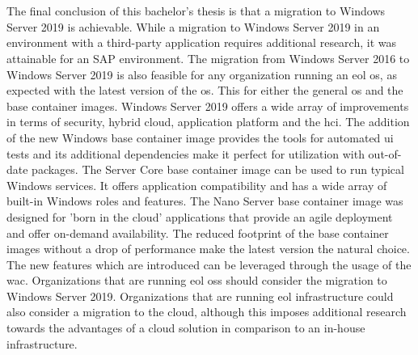 \chapter{}
\label{ch:conclusie}



The final conclusion of this bachelor's thesis is that a migration to Windows Server 2019 is achievable.
While a migration to Windows Server 2019 in an environment with a third-party application requires additional research, it was attainable for an SAP environment. 
The migration from Windows Server 2016 to Windows Server 2019 is also feasible for any organization running an \acrshort{eol} \acrshort{os}, as expected with the latest version of the \acrshort{os}.
This for either the general \acrshort{os} and the base container images.
Windows Server 2019 offers a wide array of improvements in terms of security, hybrid cloud, application platform and the \acrfull{hci}.
The addition of the new Windows base container image provides the tools for automated \acrshort{ui} tests and its additional dependencies make it perfect for utilization with out-of-date packages. 
The Server Core base container image can be used to run typical Windows services. 
It offers application compatibility and has a wide array of built-in Windows roles and features. 
The Nano Server base container image was designed for 'born in the cloud' applications that provide an agile deployment and offer on-demand availability. 
The reduced footprint of the base container images without a drop of performance make the latest version the natural choice. 
The new features which are introduced can be leveraged through the usage of the \acrfull{wac}.
Organizations that are running \acrshort{eol} \acrlong{os}s should consider the migration to Windows Server 2019.
Organizations that are running \acrshort{eol} infrastructure could also consider a migration to the cloud, although this imposes additional research towards the advantages of a cloud solution in comparison to an in-house infrastructure.
